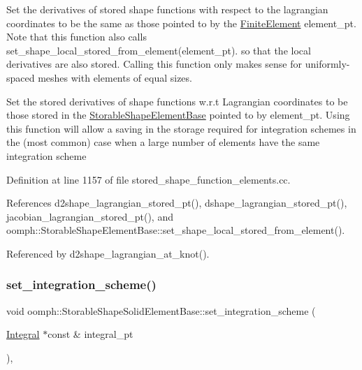 Set the derivatives of stored shape functions with respect to the lagrangian coordinates to be the same as those pointed to by the \hyperlink{classoomph_1_1FiniteElement}{Finite\+Element} element\+\_\+pt. Note that this function also calls set\+\_\+shape\+\_\+local\+\_\+stored\+\_\+from\+\_\+element(element\+\_\+pt). so that the local derivatives are also stored. Calling this function only makes sense for uniformly-\/spaced meshes with elements of equal sizes. 

Set the stored derivatives of shape functions w.\+r.\+t Lagrangian coordinates to be those stored in the \hyperlink{classoomph_1_1StorableShapeElementBase}{Storable\+Shape\+Element\+Base} pointed to by element\+\_\+pt. Using this function will allow a saving in the storage required for integration schemes in the (most common) case when a large number of elements have the same integration scheme 

Definition at line 1157 of file stored\+\_\+shape\+\_\+function\+\_\+elements.\+cc.



References d2shape\+\_\+lagrangian\+\_\+stored\+\_\+pt(), dshape\+\_\+lagrangian\+\_\+stored\+\_\+pt(), jacobian\+\_\+lagrangian\+\_\+stored\+\_\+pt(), and oomph\+::\+Storable\+Shape\+Element\+Base\+::set\+\_\+shape\+\_\+local\+\_\+stored\+\_\+from\+\_\+element().



Referenced by d2shape\+\_\+lagrangian\+\_\+at\+\_\+knot().

\mbox{\label{classoomph_1_1StorableShapeSolidElementBase_acca94924abe9b0a0572ed0a73efb600a}} 
\subsubsection{\texorpdfstring{set\+\_\+integration\+\_\+scheme()}{set\_integration\_scheme()}}
{\footnotesize\ttfamily void oomph\+::\+Storable\+Shape\+Solid\+Element\+Base\+::set\+\_\+integration\+\_\+scheme (\begin{DoxyParamCaption}\item[{\hyperlink{classoomph_1_1Integral}{Integral} $\ast$const \&}]{integral\+\_\+pt }\end{DoxyParamCaption})\hspace{0.3cm}{\ttfamily [inline]}, {\ttfamily [virtual]}}



